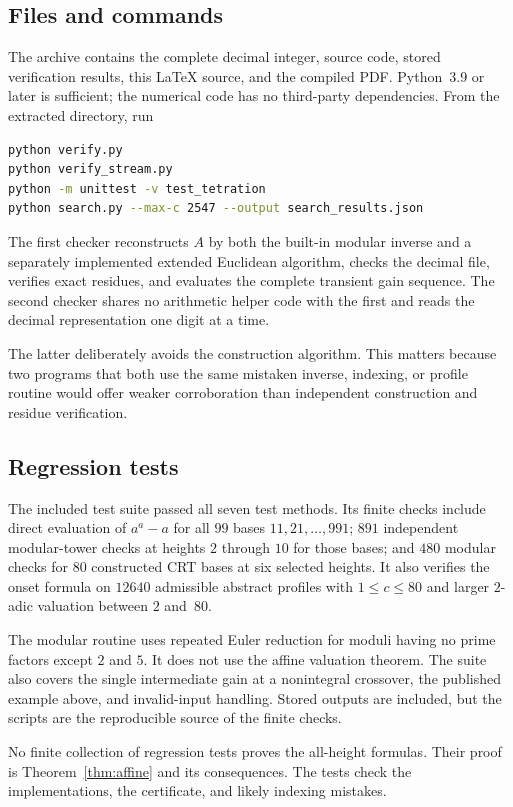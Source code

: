 \documentclass[11pt,a4paper]{article}
\theoremstyle{definition}
\theoremstyle{remark}
\begin{document}
\subsection{Files and commands}
The archive contains the complete decimal integer, source code, stored verification results, this \LaTeX{} source, and the compiled PDF. Python~3.9 or later is sufficient; the numerical code has no third-party dependencies. From the extracted directory, run
\begin{lstlisting}[language=bash]
python verify.py
python verify_stream.py
python -m unittest -v test_tetration
python search.py --max-c 2547 --output search_results.json
\end{lstlisting}
The first checker reconstructs $A$ by both the built-in modular inverse and a separately implemented extended Euclidean algorithm, checks the decimal file, verifies exact residues, and evaluates the complete transient gain sequence. The second checker shares no arithmetic helper code with the first and reads the decimal representation one digit at a time.

The latter deliberately avoids the construction algorithm. This matters because two programs that both use the same mistaken inverse, indexing, or profile routine would offer weaker corroboration than independent construction and residue verification.

\subsection{Regression tests}
The included test suite passed all seven test methods. Its finite checks include direct evaluation of $a^a-a$ for all $99$ bases $11,21,\ldots,991$; $891$ independent modular-tower checks at heights $2$ through $10$ for those bases; and $480$ modular checks for $80$ constructed CRT bases at six selected heights. It also verifies the onset formula on $12640$ admissible abstract profiles with $1\le c\le80$ and larger $2$-adic valuation between $2$ and~$80$.

The modular routine uses repeated Euler reduction for moduli having no prime factors except $2$ and $5$. It does not use the affine valuation theorem. The suite also covers the single intermediate gain at a nonintegral crossover, the published example above, and invalid-input handling. Stored outputs are included, but the scripts are the reproducible source of the finite checks.

No finite collection of regression tests proves the all-height formulas. Their proof is Theorem~\ref{thm:affine} and its consequences. The tests check the implementations, the certificate, and likely indexing mistakes.
\end{document}
